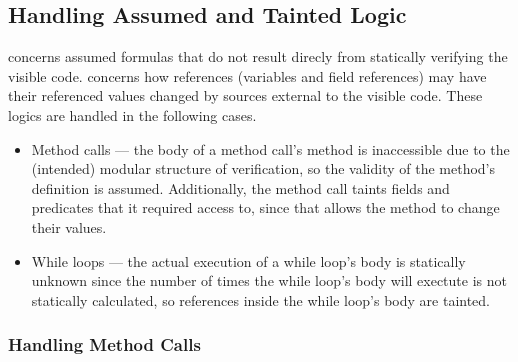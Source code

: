 \subsection{Handling Assumed and Tainted Logic}

 concerns assumed formulas that do not result direcly from statically verifying the visible code.
 concerns how references (variables and field references) may have their referenced values changed by sources external to the visible code. These logics are handled in the following cases.
\begin{itemize}
  \item Method calls --- the body of a method call's method is inaccessible due to the (intended) modular structure of verification, so the validity of the method's definition is assumed. Additionally, the method call taints fields and predicates that it required access to, since that allows the method to change their values.
  \item While loops --- the actual execution of a while loop's body is statically unknown since the number of times the while loop's body will exectute is not statically calculated, so references inside the while loop's body are tainted.
\end{itemize}

\subsubsection{Handling Method Calls}

